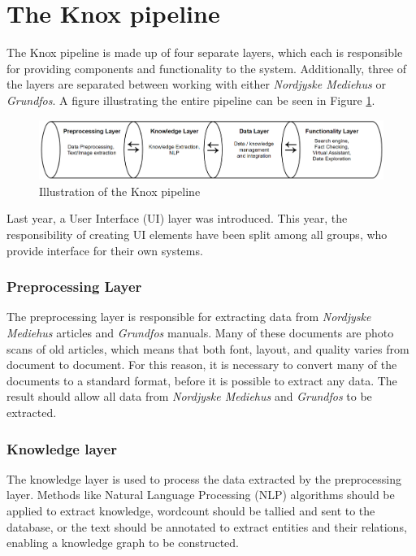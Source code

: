 \section{The Knox pipeline}\label{the_knox_pipeline}


The Knox pipeline is made up of four separate layers, which each is responsible for providing components and functionality to the system.
 Additionally, three of the layers are separated between working with either \textit{Nordjyske Mediehus} or \textit{Grundfos}.
  A figure illustrating the entire pipeline can be seen in Figure \ref{fig:pipeline}.

\begin{figure}[h]
    \centering
    \includegraphics[width=1\textwidth]{Images/Pipeline.PNG}
    \caption{Illustration of the Knox pipeline\label{fig:pipeline}}
\end{figure}

Last year, a User Interface (UI) layer was introduced. This year, the responsibility of creating UI elements have been split among all groups, who provide interface for their own systems.

\subsubsection{Preprocessing Layer}
The preprocessing layer is responsible for extracting data from \textit{Nordjyske Mediehus} articles and \textit{Grundfos} manuals. Many of these documents are photo scans of old articles, which means that both font, layout, and quality varies from document to document. For this reason, it is necessary to convert many of the documents to a standard format, before it is possible to extract any data. The result should allow all data from \textit{Nordjyske Mediehus} and \textit{Grundfos} to be extracted. 

\subsubsection{Knowledge layer}
The knowledge layer is used to process the data extracted by the preprocessing layer. Methods like Natural Language Processing (NLP) algorithms should be applied to extract knowledge, wordcount should be tallied and sent to the database, or the text should be annotated to extract entities and their relations, enabling a knowledge graph to be constructed.

